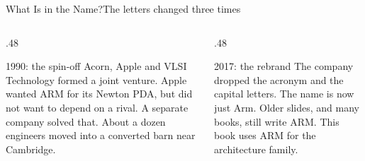 \documentclass[9pt,aspectratio=169,xcolor=table]{beamer}
\begin{document}
{\beamerextras
\begin{frame}{What Is in the Name?}{The letters changed three times}
    \begin{center}
    \end{center}

    \vspace{2mm}
    \begin{columns}[T]
    \begin{column}{.48\textwidth}
        \begin{block}{1990: the spin-off}
            {\small Acorn, Apple and VLSI Technology formed a joint venture. Apple wanted ARM for its Newton PDA, but did not want to depend on a rival. A separate company solved that. About a dozen engineers moved into a converted \alert{barn} near Cambridge.}
        \end{block}
    \end{column}
    \begin{column}{.48\textwidth}
        \begin{block}{2017: the rebrand}
            {\small The company dropped the acronym and the capital letters. The name is now just \alert{Arm}. Older slides, and many books, still write ARM. This book uses ARM for the architecture family.}
        \end{block}
    \end{column}
    \end{columns}
\end{frame}
}
\end{document}
